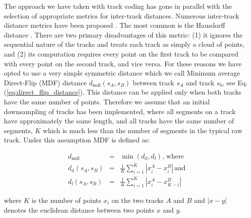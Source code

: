 \documentclass[preprint,authoryear,a4paper,10pt,onecolumn]{elsarticle}
\begin{document}
The approach we have taken with track coding has gone in parallel with
the selection of appropriate metrics for inter-track distances.
Numerous inter-track distance metrics have been proposed
\citep{Ding2003, MaddahIPMI2007, zhang2005dti}. The most common is the
Hausdorff distance \citep[and many other
studies]{corouge2004towards}. There are two primary disadvantages of
this metric: (1) it ignores the sequential nature of the tracks and
treats each track as simply a cloud of points, and (2) its computation
requires every point on the first track to be compared with every point
on the second track, and vice versa. For these reasons we have opted to
use a very simple symmetric distance \citep{EGMB10, Visser2010} which we
call Minimum average Direct-Flip (MDF) distance
$d_{\textrm{mdf}}(s_{A},s_{B})$ between track $s_{A}$ and track $s_{b}$,
see Eq. (\ref{eq:direct_flip_distance}).  This distance can be applied
only when both tracks have the same number of points. Therefore we
assume that an initial downsampling of tracks has been implemented,
where all segments on a track have approximately the same length, and
all tracks have the same number of segments, $K$ which is much less than
the number of segments in the typical raw track. Under this assumption MDF is
defined as:

\begin{eqnarray}
d_{\textrm{mdf}} & = & \min(d_{\textrm{d}},d_{\textrm{f}}),\,\textrm{where}\label{eq:direct_flip_distance}\\
d_{\textrm{d}}(s_{A},s_{B}) & = & \frac{1}{K}\sum_{i=1}^{K}|x_{i}^{A}-x_{i}^{B}|\,\textrm{and}\nonumber \\
d_{\textrm{f}}(s_{A},s_{B}) & = & \frac{1}{K}\sum_{i=1}^{K}|x_{i}^{A}-x_{K-i}^{B}|\nonumber \end{eqnarray}


where $K$ is the number of points $x_{i}$ on the two tracks $A$ and $B$
and $|x-y|$ denotes the euclidean distance between two points $x$ and
$y$.
\end{document}
